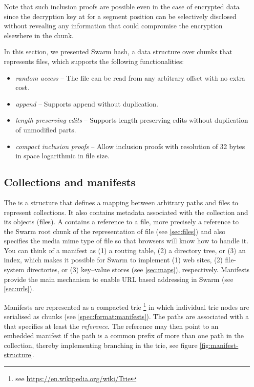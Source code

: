 Note that such inclusion proofs are possible even in the case of encrypted data since the decryption key at for a segment position can be selectively disclosed without revealing any information that could compromise the encryption elsewhere in the chunk.

In this section, we presented Swarm hash, a data structure over chunks that represents files, which supports the following functionalities:

\begin{itemize}
    \item \emph{random access} -- The file can be read from any arbitrary offset with no extra cost.
    \item \emph{append} -- Supports append without duplication. 
    \item \emph{length preserving edits} -- Supports length preserving edits without duplication of unmodified parts.
    \item \emph{compact inclusion proofs} -- Allow inclusion proofs with resolution of 32 bytes in space logarithmic in file size.
\end{itemize}



\subsection{Collections and manifests\statusgreen}\label{sec:collections}

The  is a structure that defines a mapping between arbitrary paths and files to represent collections. It also contains metadata associated with the collection and its objects (files). A  contains a reference to a file, more precisely a reference to the Swarm root chunk of the representation of file (see \ref{sec:files}) and also specifies the media mime type of file so that browsers will know how to handle it. You can think of a manifest as (1) a routing table, (2) a directory tree, or  (3) an index, which makes it possible for Swarm to implement (1) web sites, (2) file-system directories, or (3) key--value stores (see \ref{sec:maps}), respectively. Manifests provide the main mechanism to enable URL based addressing in Swarm (see \ref{sec:urls}). 

Manifests are represented as a compacted trie%
%
\footnote{see \url{https://en.wikipedia.org/wiki/Trie}}
%
in which individual trie nodes are serialised as chunks (see \ref{spec:format:manifests}). The paths are associated with a  that specifies at least the \emph{reference}. The reference may then point to an embedded manifest if the path is a common prefix of more than one path in the collection, thereby implementing branching in the trie, see figure \ref{fig:manifest-structure}. 


